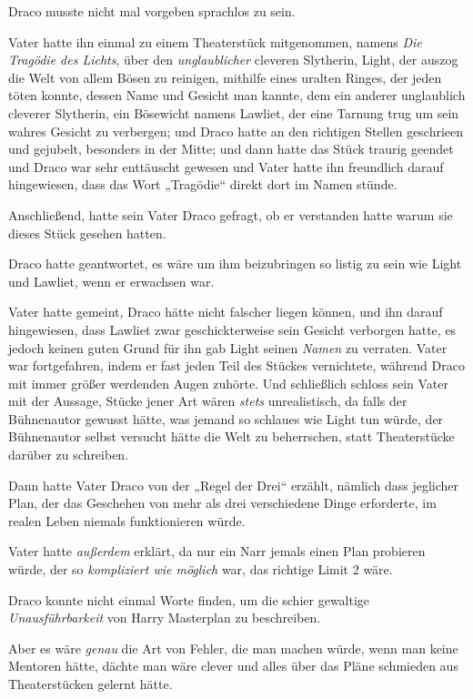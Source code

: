 {Draco musste nicht mal vorgeben sprachlos zu sein.

Vater hatte ihn einmal zu einem Theaterstück mitgenommen, namens \emph{Die Tragödie des Lichts}, über den \emph{unglaublicher} cleveren Slytherin, Light, der auszog die Welt von allem Bösen zu reinigen, mithilfe eines uralten Ringes, der jeden töten konnte, dessen Name und Gesicht man kannte, dem ein anderer unglaublich cleverer Slytherin, ein Bösewicht namens Lawliet, der eine Tarnung trug um sein wahres Gesicht zu verbergen; und Draco hatte an den richtigen Stellen geschrieen und gejubelt, besonders in der Mitte; und dann hatte das Stück traurig geendet und Draco war sehr enttäuscht gewesen und Vater hatte ihn freundlich darauf hingewiesen, dass das Wort „Tragödie“ direkt dort im Namen stünde.

Anschließend, hatte sein Vater Draco gefragt, ob er verstanden hatte warum sie dieses Stück gesehen hatten.

Draco hatte geantwortet, es wäre um ihm beizubringen so listig zu sein wie Light und Lawliet, wenn er erwachsen war.

Vater hatte gemeint, Draco hätte nicht falscher liegen können, und ihn darauf hingewiesen, dass Lawliet zwar geschickterweise sein Gesicht verborgen hatte, es jedoch keinen guten Grund für ihn gab Light seinen \emph{Namen} zu verraten. Vater war fortgefahren, indem er fast jeden Teil des Stückes vernichtete, während Draco mit immer größer werdenden Augen zuhörte. Und schließlich schloss sein Vater mit der Aussage, Stücke jener Art wären \emph{stets} unrealistisch, da falls der Bühnenautor gewusst hätte, was jemand so schlaues wie Light tun würde, der Bühnenautor selbst versucht hätte die Welt zu beherrschen, statt Theaterstücke darüber zu schreiben.

Dann hatte Vater Draco von der „Regel der Drei“ erzählt, nämlich dass jeglicher Plan, der das Geschehen von mehr als drei verschiedene Dinge erforderte, im realen Leben niemals funktionieren würde.

Vater hatte \emph{außerdem} erklärt, da nur ein Narr jemals einen Plan probieren würde, der so \emph{kompliziert wie möglich} war, das richtige Limit 2 wäre.

Draco konnte nicht einmal Worte finden, um die schier gewaltige \emph{Unausführbarkeit} von Harry Masterplan zu beschreiben.

Aber es wäre \emph{genau} die Art von Fehler, die man machen würde, wenn man keine Mentoren hätte, dächte man wäre clever und alles über das Pläne schmieden aus Theaterstücken gelernt hätte.

}
